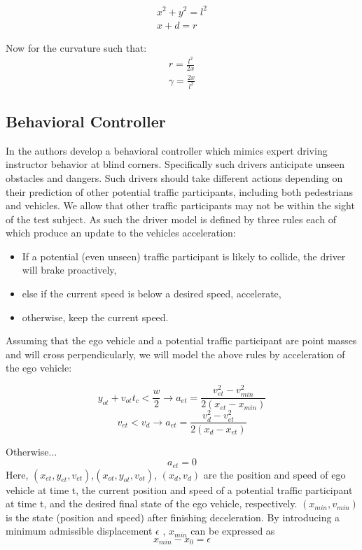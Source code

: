 \documentclass{easychair}
\theoremstyle{theorem}
\theoremstyle{remark}
\begin{document}
\begin{align}
x^2+y^2=l^2\\
x+d=r
\end{align}

\noindent Now for the curvature such that:
\begin{align}
r=\frac{l^2}{2x}\\
\gamma=\frac{2x}{l^2}
\end{align}


\subsection{Behavioral Controller}
In \cite{Ninomiya} the authors develop a behavioral controller which mimics expert driving instructor behavior at blind corners. Specifically such drivers anticipate unseen obstacles and dangers. Such drivers should take different actions depending on their prediction of other potential traffic participants, including both pedestrians and vehicles. We allow that other traffic participants may not be within the sight of the test subject. As such the driver model is defined by three rules each of which produce an update to the vehicles acceleration: 
\begin{itemize}
	\item If a potential (even unseen) traffic participant is likely to collide, the driver will brake proactively, 
	\item else if the current speed is below a desired speed, accelerate, 
	\item otherwise, keep the current speed. 
\end{itemize}

Assuming that the ego vehicle and a potential traffic participant are point masses and will cross perpendicularly, we will model the above rules by acceleration of the ego vehicle:

\begin{equation}
y_{ot}+v_{ot}t_c < \frac{w}{2} \to a_{et} = \frac{v_{et}^2 - v_{min}^2}{2(x_{et}-x_{min})} 
\end{equation} 
\begin{equation}
v_{et}<v_d \to a_{et}=	\frac{v_{d}^2 -v_{et}^2}{2(x_d - x_{et})}
\end{equation}

\noindent Otherwise...
\begin{equation}
a_{et}=0
\end{equation}
Here, $(x_{et}, y_{et}, v_{et})$,$(x_{ot}, y_{ot}, v_{ot})$, $(x_d,v_d)$ are the position and speed of ego vehicle at time t, the current position and speed of a potential traffic participant at time t, and the desired final state of the ego vehicle, respectively. $(x_{min},v_{min})$  is the state (position and speed) after finishing deceleration. By introducing a minimum admissible displacement $\epsilon$ , $x_{min}$  can be expressed as
\begin{equation}
x_{min} - x_0=\epsilon
\end{equation}
\end{document}
